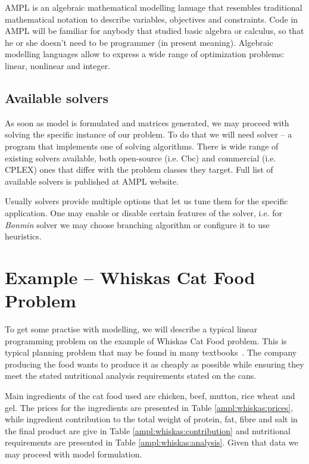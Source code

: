 AMPL is an algebraic mathematical modelling lanuage that resembles traditional mathematical notation to describe variables, objectives and constraints. Code in AMPL will be familiar for anybody that studied basic algebra or calculus, so that he or she doesn't need to be programmer (in present meaning). Algebraic modelling languages allow to express a wide range of optimization problems: linear, nonlinear and integer.

\subsection{Available solvers}

As soon as model is formulated and matrices generated, we may proceed with solving the specific instance of our problem. To do that we will need solver -- a program that implements one of solving algorithms. There is wide range of existing solvers available, both open-source (i.e. Cbc\cite{cbc-solver}) and commercial (i.e. CPLEX\cite{cplex}) ones that differ with the problem classes they target. Full list of available solvers is published at AMPL website\cite{AMPLSolvers}.

Usually solvers provide multiple options that let us tune them for the specific application. One may enable or disable certain features of the solver, i.e. for \emph{Bonmin}\cite{Bonmin} solver we may choose branching algorithm or configure it to use heuristics.

\section{Example -- Whiskas Cat Food Problem}
\label{sec:ampl:whiskas}

To get some practise with modelling, we will describe a typical linear programming problem on the example of Whiskas Cat Food problem. This is typical planning problem that may be found in many textbooks~\cite{dantzig}.  The company producing the food wants to produce it as cheaply as possible while ensuring they meet the stated nutritional analysis requirements stated on the cans. 

Main ingredients of the cat food used are chicken, beef, mutton, rice wheat and gel. The prices for the ingredients are presented in Table \ref{ampl:whiskas:prices}, while ingredient contribution to the total weight of protein, fat, fibre and salt in the final product are give in Table \ref{ampl:whiskas:contribution} and nutritional requirements are presented in Table \ref{ampl:whiskas:analysis}. Given that data we may proceed with model formulation.

